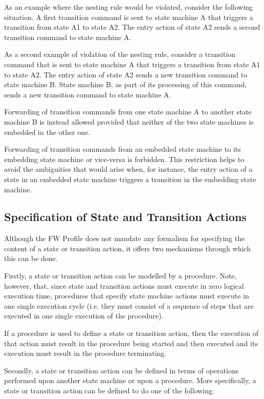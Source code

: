 \documentclass[a4paper,10pt]{article}
\begin{document}
As an example where the nesting rule would be violated, consider the following situation. A
first transition command is sent to state machine A that triggers a transition from state A1 to
state A2. The entry action of state A2 sends a second transition command to state machine A.

As a second example of violation of the nesting rule, consider a transition command that is
sent to state machine A that triggers a transition from state A1 to state A2. The entry action of
state A2 sends a new transition command to state machine B. State machine B, as part of its
processing of this command, sends a new transition command to state machine A.

Forwarding of transition commands from one state machine A to another state machine B is
instead allowed provided that neither of the two state machines is embedded in the other one.

Forwarding of transition commands from an embedded state machine to its embedding state
machine or vice-versa is forbidden. This restriction helps to avoid the ambiguities that would
arise when, for instance, the entry action of a state in an embedded state machine triggers a
transition in the embedding state machine.

\subsection{Specification of State and Transition Actions}
Although the FW Profile does not mandate any formalism for specifying the content of a state
or transition action, it offers two mechanisms through which this can be done.

Firstly, a state or transition action can be modelled by a procedure. Note, however, that, since
state and transition actions must execute in zero logical execution time, procedures that specify state
machine actions must execute in one single execution cycle (i.e. they must consist of a
sequence of steps that are executed in one single execution of the procedure).

If a procedure is used to define a state or transition action, then the execution of that action must result in the procedure being started and then executed and its execution must result in the procedure terminating.

Secondly, a state or transition action can be defined in terms of operations performed upon
another state machine or upon a procedure. More specifically, a state or transition action can be
defined to do one of the following:
\end{document}

